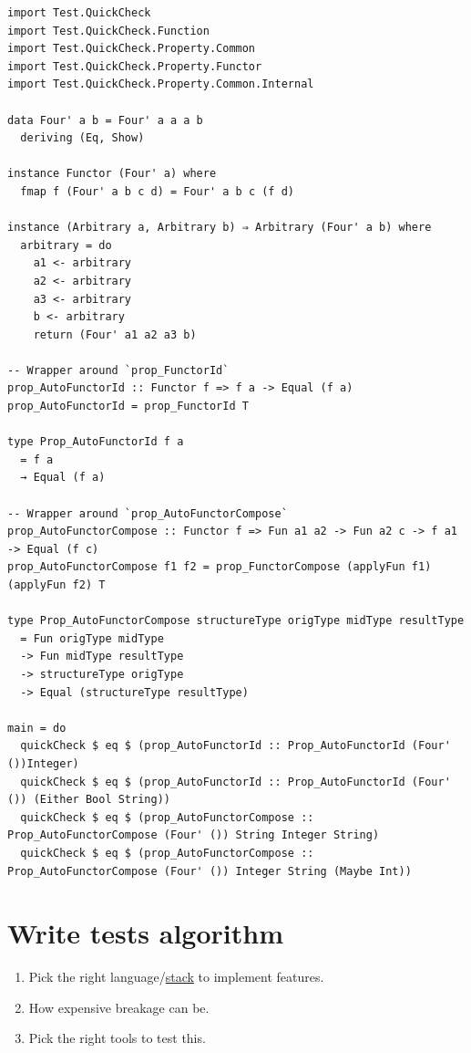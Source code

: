 \documentclass[a4paper,14pt,oneside]{book}
\begin{document}
\begin{verbatim}
import Test.QuickCheck
import Test.QuickCheck.Function
import Test.QuickCheck.Property.Common
import Test.QuickCheck.Property.Functor
import Test.QuickCheck.Property.Common.Internal

data Four' a b = Four' a a a b
  deriving (Eq, Show)

instance Functor (Four' a) where
  fmap f (Four' a b c d) = Four' a b c (f d)

instance (Arbitrary a, Arbitrary b) ⇒ Arbitrary (Four' a b) where
  arbitrary = do
    a1 <- arbitrary
    a2 <- arbitrary
    a3 <- arbitrary
    b <- arbitrary
    return (Four' a1 a2 a3 b)

-- Wrapper around `prop_FunctorId`
prop_AutoFunctorId :: Functor f => f a -> Equal (f a)
prop_AutoFunctorId = prop_FunctorId T

type Prop_AutoFunctorId f a
  = f a
  → Equal (f a)

-- Wrapper around `prop_AutoFunctorCompose`
prop_AutoFunctorCompose :: Functor f => Fun a1 a2 -> Fun a2 c -> f a1 -> Equal (f c)
prop_AutoFunctorCompose f1 f2 = prop_FunctorCompose (applyFun f1) (applyFun f2) T

type Prop_AutoFunctorCompose structureType origType midType resultType
  = Fun origType midType
  -> Fun midType resultType
  -> structureType origType
  -> Equal (structureType resultType)

main = do
  quickCheck $ eq $ (prop_AutoFunctorId :: Prop_AutoFunctorId (Four' ())Integer)
  quickCheck $ eq $ (prop_AutoFunctorId :: Prop_AutoFunctorId (Four' ()) (Either Bool String))
  quickCheck $ eq $ (prop_AutoFunctorCompose :: Prop_AutoFunctorCompose (Four' ()) String Integer String)
  quickCheck $ eq $ (prop_AutoFunctorCompose :: Prop_AutoFunctorCompose (Four' ()) Integer String (Maybe Int))
\end{verbatim}

\section{Write tests algorithm}
\label{sec:orgc949152}

\begin{enumerate}
\item Pick the right language/\hyperref[org47c7259]{stack} to implement features.\\
\item How expensive breakage can be.\\
\item Pick the right tools to test this.\\
\end{enumerate}
\end{document}
